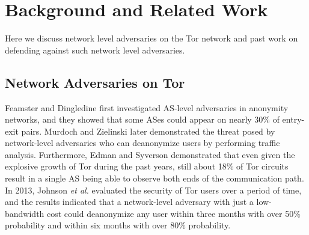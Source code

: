 \section{Background and Related Work}
Here we discuss network level adversaries on the Tor network and past work on defending against such network level adversaries. 

\subsection{Network Adversaries on Tor}
%
Feamster and Dingledine \cite{feamster2004location} first investigated AS-level adversaries in anonymity networks, and they showed that some ASes could appear on nearly 30\% of entry-exit pairs. Murdoch and Zielinski \cite{murdoch2007sampled} later demonstrated the threat posed by network-level adversaries who can deanonymize users by performing traffic analysis. Furthermore, Edman and Syverson \cite{edman2009awareness} demonstrated that even given the explosive growth of Tor during the past years, still about 18\% of Tor circuits result in a single AS being able to observe both ends of the communication path. In 2013, Johnson \emph{et al.} \cite{johnson2013users} evaluated the security of Tor users over a period of time, and the results indicated that a network-level adversary with just a low-bandwidth cost could deanonymize any user within three months with over 50\% probability and within six months with over 80\% probability.

